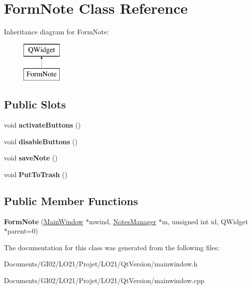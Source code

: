 \hypertarget{class_form_note}{}\section{Form\+Note Class Reference}
\label{class_form_note}
Inheritance diagram for Form\+Note\+:\begin{figure}[H]
\begin{center}
\leavevmode
\includegraphics[height=2.000000cm]{class_form_note}
\end{center}
\end{figure}
\subsection*{Public Slots}
\begin{DoxyCompactItemize}
\item 
\mbox{\label{class_form_note_a6e4ade87e298737a37407194519f6bdd}} 
void {\bfseries activate\+Buttons} ()
\item 
\mbox{\label{class_form_note_a989367d8a01755c740252a5f08610cb6}} 
void {\bfseries disable\+Buttons} ()
\item 
\mbox{\label{class_form_note_a052d71f4e7c3cae5cb8fa8979a2214c0}} 
void {\bfseries save\+Note} ()
\item 
\mbox{\label{class_form_note_a1a8becf0976ab645b89546851da17dff}} 
void {\bfseries Put\+To\+Trash} ()
\end{DoxyCompactItemize}
\subsection*{Public Member Functions}
\begin{DoxyCompactItemize}
\item 
\mbox{\label{class_form_note_aeaa8060643121e5567cb140990e5cbd0}} 
{\bfseries Form\+Note} (\hyperlink{class_main_window}{Main\+Window} $\ast$mwind, \hyperlink{class_notes_manager}{Notes\+Manager} $\ast$m, unsigned int id, Q\+Widget $\ast$parent=0)
\end{DoxyCompactItemize}


The documentation for this class was generated from the following files\+:\begin{DoxyCompactItemize}
\item 
Documents/\+G\+I02/\+L\+O21/\+Projet/\+L\+O21/\+Qt\+Version/mainwindow.\+h\item 
Documents/\+G\+I02/\+L\+O21/\+Projet/\+L\+O21/\+Qt\+Version/mainwindow.\+cpp\end{DoxyCompactItemize}
